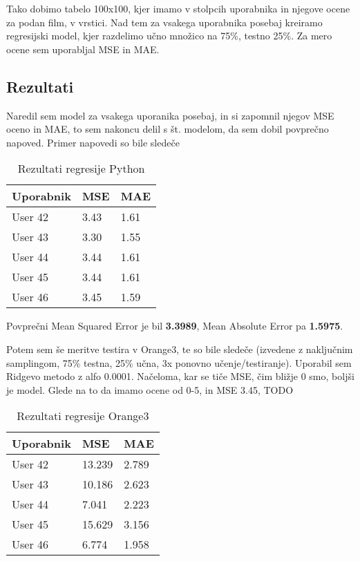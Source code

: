 \documentclass[a4paper,11pt]{article}
\begin{document}
Tako dobimo tabelo 100x100, kjer imamo v stolpcih uporabnika in njegove ocene za podan film, v vrstici. Nad tem za vsakega uporabnika posebaj kreiramo regresijski model, kjer razdelimo učno množico na 75\%, testno 25\%. Za mero ocene sem uporabljal MSE in MAE.

\subsection{Rezultati}

Naredil sem model za vsakega uporanika posebaj, in si zapomnil njegov MSE oceno in MAE, to sem nakoncu delil s št. modelom, da sem dobil povprečno napoved. Primer napovedi so bile sledeče

\begin{table}[htbp]
	\caption{Rezultati regresije Python}
	\label{tab_py_regr}
	\begin{center}
		\begin{tabular}{llp{3cm}}
			
			\hline
			Uporabnik & MSE & MAE \\
			\hline
			User 42 & 3.43 & 1.61 \\
			User 43 & 3.30 & 1.55 \\
			User 44 & 3.44 & 1.61\\
			User 45 & 3.44 & 1.61   \\
			User 46 & 3.45 & 1.59  \\
			\hline
		\end{tabular}
	\end{center}
\end{table}

Povprečni Mean Squared Error je bil  \textbf{3.3989}, Mean Absolute Error pa \textbf{1.5975}.

Potem sem še meritve testira v Orange3, te so bile sledeče (izvedene z naključnim samplingom, 75\% testna, 25\% učna, 3x ponovno učenje/testiranje). Uporabil sem Ridgevo metodo z alfo 0.0001. Načeloma, kar se tiče MSE, čim bližje 0 smo, boljši je model. Glede na to da imamo ocene od 0-5, in MSE 3.45, TODO

\begin{table}[htbp]
	\caption{Rezultati regresije Orange3}
	\label{tab_or_regr}
	\begin{center}
		\begin{tabular}{llp{3cm}}
			
			\hline
			Uporabnik & MSE & MAE \\
			\hline
			User 42 & 13.239 & 2.789 \\
			User 43 & 10.186 & 2.623 \\
			User 44 & 7.041 & 2.223 \\
			User 45 & 15.629 & 3.156   \\
			User 46 & 6.774 & 1.958  \\
			\hline
		\end{tabular}
	\end{center}
\end{table}
\end{document}
